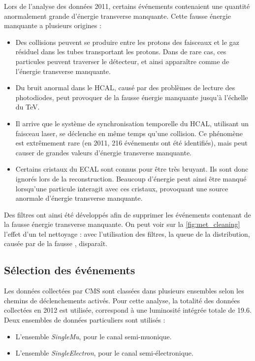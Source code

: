 Lors de l'analyse des données 2011, certains événements contenaient une quantité anormalement grande d'énergie transverse manquante. Cette fausse énergie manquante a plusieurs origines :
\begin{itemize}
  \item Des collisions peuvent se produire entre les protons des faisceaux et le gaz résiduel dans les tubes transportant les protons. Dans de rare cas, ces particules peuvent traverser le détecteur, et ainsi apparaître comme de l'énergie transverse manquante.
  \item Du bruit anormal dans le HCAL, causé par des problèmes de lecture des photodiodes, peut provoquer de la fausse énergie manquante jusqu'à l'échelle du \si{\TeV}.
  \item Il arrive que le système de synchronisation temporelle du HCAL, utilisant un faisceau laser, se déclenche en même temps qu'une collision. Ce phénomène est extrêmement rare (en 2011, 216 événements ont été identifiés), mais peut causer de grandes valeurs d'énergie transverse manquante.
  \item Certains cristaux du ECAL sont connus pour être très bruyant. Ils sont donc ignorés lors de la reconstruction. Beaucoup d'énergie peut ainsi être manqué lorsqu'une particule interagit avec ces cristaux, provoquant une source anormale d'énergie transverse manquante.
\end{itemize}

Des filtres ont ainsi été développés afin de supprimer les événements contenant de la fausse énergie transverse manquante. On peut voir sur la \cref{fig:met_cleaning} l'effet d'un tel nettoyage : avec l'utilisation des filtres, la queue de la distribution, causée par de la fausse \met, disparaît.

\subsection{Sélection des événements}

Les données collectées par CMS sont classées dans plusieurs ensembles selon les chemins de déclenchements activés. Pour cette analyse, la totalité des données collectées en 2012 est utilisée, correspond à une luminosité intégrée totale de \SI{19.6}{\invfb}. Deux ensembles de données particuliers sont utilisés :
\begin{itemize}
  \item L'ensemble \emph{SingleMu}, pour le canal semi-muonique.
  \item L'ensemble \emph{SingleElectron}, pour le canal semi-électronique.
\end{itemize}

